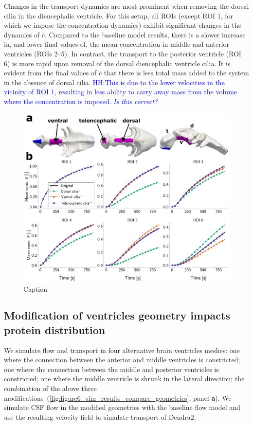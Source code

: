 \documentclass[fleqn]{wlscirep}
\newcommand{\lyng}[1]{\textcolor{blue}{#1}}
\begin{document}
Changes in the transport dynamics are most prominent when removing the dorsal cilia in the diencephalic ventricle. For this setup, all ROIs (except ROI 1, for which we impose the concentration dynamics) exhibit significant changes in the dynamics of $\overline{c}$. Compared to the baseline model results, there is a slower increase in, and lower final values of, the mean concentration in middle and anterior ventricles (ROIs 2--5). In contrast, the transport to the posterior ventricle (ROI 6) is more rapid upon removal of the dorsal diencephalic ventricle cilia. It is evident from the final values of $\overline{c}$ that there is less total mass added to the system in the absence of dorsal cilia. \lyng{HH:This is due to the lower velocities in the vicinity of ROI 1, resulting in less ability to carry away mass from the volume where the concentration is imposed. \emph{Is this correct?}}
\begin{figure}[H]
    \centering
    \includegraphics[width=\textwidth]{graphics/figure5_compare_cilia_modifications.png}
    \caption{Caption}
    \label{fig:figure5_compare_cilia_modifications}
\end{figure}

\subsection*{Modification of ventricles geometry impacts protein distribution}
We simulate flow and transport in four alternative brain ventricles meshes: one where the connection between the anterior and middle ventricles is constricted; one where the connection between the middle and posterior ventricles is constricted; one where the middle ventricle is shrunk in the lateral direction; the combination of the above three modifications~(\cref{fig:figure6_sim_results_compare_geometries}, panel \textbf{a}). We simulate CSF flow in the modified geometries with the baseline flow model and use the resulting velocity field to simulate transport of Dendra2.
\end{document}
